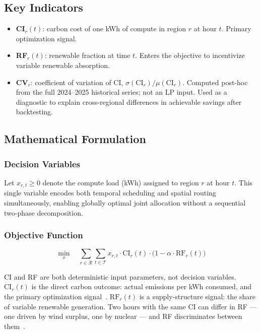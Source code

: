 \subsection{Key Indicators}

\begin{itemize}[leftmargin=1.5em]
  \item \textbf{CI$_r(t)$}: carbon cost of one kWh of compute in region $r$ at hour $t$. Primary optimization signal.
  \item \textbf{RF$_r(t)$}: renewable fraction at time $t$. Enters the objective to incentivize variable renewable absorption.
  \item \textbf{CV$_r$}: coefficient of variation of CI, $\sigma(\mathrm{CI}_r)/\mu(\mathrm{CI}_r)$. Computed post-hoc from the full 2024--2025 historical series; not an LP input. Used as a diagnostic to explain cross-regional differences in achievable savings after backtesting.
\end{itemize}

\subsection{Mathematical Formulation}

\subsubsection*{Decision Variables}

Let $x_{r,t} \geq 0$ denote the compute load (kWh) assigned to region $r$ at hour $t$.
This single variable encodes both temporal scheduling and spatial routing simultaneously, enabling globally optimal joint allocation without a sequential two-phase decomposition.

\subsubsection*{Objective Function}

\begin{equation}
  \min_{x} \quad \sum_{r \in \mathcal{R}} \sum_{t \in \mathcal{T}}
    x_{r,t} \cdot \mathrm{CI}_r(t) \cdot \bigl(1 - \alpha \cdot \mathrm{RF}_r(t)\bigr)
  \label{eq:objective}
\end{equation}

CI and RF are both deterministic input parameters, not decision variables. $\mathrm{CI}_r(t)$ is the direct carbon outcome: actual emissions per kWh consumed, and the primary optimization signal~\cite{radovanovic2023}. $\mathrm{RF}_r(t)$ is a supply-structure signal: the share of variable renewable generation. Two hours with the same CI can differ in RF — one driven by wind surplus, one by nuclear — and RF discriminates between them~\cite{radovanovic2023, liu2012}.

